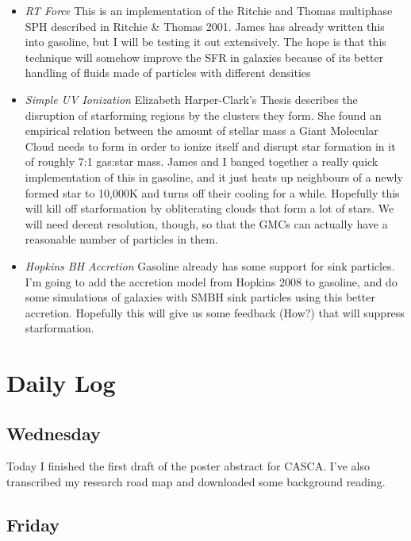 \documentclass[11pt,letterpaper]{article}
\begin{document}
\begin{itemize}
\item
  \emph{RT Force} This is an implementation of the Ritchie and Thomas
  multiphase SPH described in Ritchie \& Thomas 2001. James has already
  written this into gasoline, but I will be testing it out extensively.
  The hope is that this technique will somehow improve the SFR in
  galaxies because of its better handling of fluids made of particles
  with different densities
\item
  \emph{Simple UV Ionization} Elizabeth Harper-Clark's Thesis describes
  the disruption of starforming regions by the clusters they form. She
  found an empirical relation between the amount of stellar mass a Giant
  Molecular Cloud needs to form in order to ionize itself and disrupt
  star formation in it of roughly 7:1 gas:star mass. James and I banged
  together a really quick implementation of this in gasoline, and it
  just heats up neighbours of a newly formed star to 10,000K and turns
  off their cooling for a while. Hopefully this will kill off
  starformation by obliterating clouds that form a lot of stars. We will
  need decent resolution, though, so that the GMCs can actually have a
  reasonable number of particles in them.
\item
  \emph{Hopkins BH Accretion} Gasoline already has some support for sink
  particles. I'm going to add the accretion model from Hopkins 2008 to
  gasoline, and do some simulations of galaxies with SMBH sink particles
  using this better accretion. Hopefully this will give us some feedback
  (How?) that will suppress starformation.
\end{itemize}

\section{Daily Log}

\subsection{Wednesday}

Today I finished the first draft of the poster abstract for CASCA. I've
also transcribed my research road map and downloaded some background
reading.

\subsection{Friday}
\end{document}
